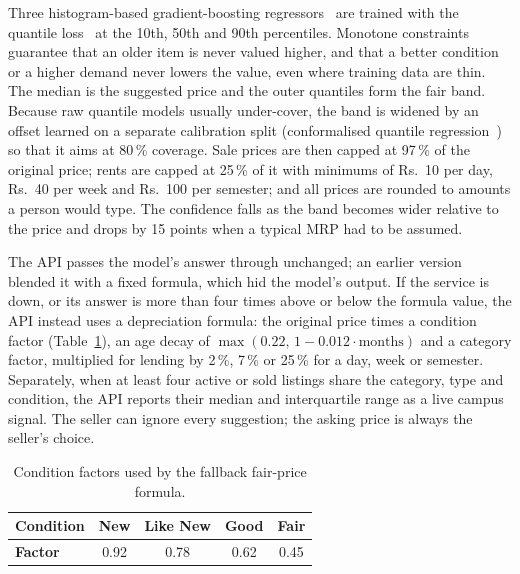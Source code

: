 \documentclass[11pt,letterpaper,oneside]{report}
\begin{document}
Three histogram-based gradient-boosting regressors~\cite{friedman,lightgbm} are trained with the quantile
loss~\cite{koenker} at the 10th, 50th and 90th percentiles. Monotone constraints guarantee that an older
item is never valued higher, and that a better condition or a higher demand never lowers the value,
even where training data are thin. The median is the suggested price and the outer quantiles form the
fair band. Because raw quantile models usually under-cover, the band is widened by an offset learned on
a separate calibration split (conformalised quantile regression~\cite{romano}) so that it aims at 80\,\%
coverage. Sale prices are then capped at 97\,\% of the original price; rents are capped at 25\,\% of it
with minimums of Rs.~10 per day, Rs.~40 per week and Rs.~100 per semester; and all prices are rounded to
amounts a person would type. The confidence falls as the band becomes wider relative to the price and
drops by 15 points when a typical MRP had to be assumed.

The API passes the model's answer through unchanged; an earlier version blended it with a fixed formula,
which hid the model's output. If the service is down, or its answer is more than four times above or
below the formula value, the API instead uses a depreciation formula: the original price times a
condition factor (Table~\ref{tab:cond}), an age decay of $\max(0.22,\,1-0.012\cdot\text{months})$ and a
category factor, multiplied for lending by 2\,\%, 7\,\% or 25\,\% for a day, week or semester. Separately,
when at least four active or sold listings share the category, type and condition, the API reports their
median and interquartile range as a live campus signal. The seller can ignore every suggestion; the
asking price is always the seller's choice.

\begin{table}[h]
\centering
\caption{Condition factors used by the fallback fair-price formula.}\label{tab:cond}
\small
\begin{tabular}{@{}lcccc@{}}
\toprule
\textbf{Condition} & New & Like New & Good & Fair\\
\midrule
\textbf{Factor} & 0.92 & 0.78 & 0.62 & 0.45\\
\bottomrule
\end{tabular}
\end{table}
\end{document}
